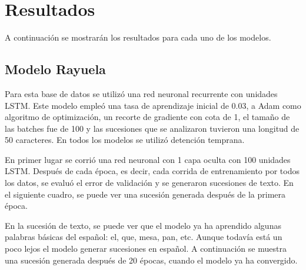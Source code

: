 \section{Resultados}
A continuación se mostrarán los resultados para cada uno de los modelos.

\subsection{Modelo Rayuela}
Para esta base de datos se utilizó una red neuronal recurrente con unidades LSTM. Este modelo empleó una tasa de aprendizaje inicial de 0.03, a Adam como algoritmo de optimización, un recorte de gradiente con cota de 1, el tamaño de las batches fue de 100 y las sucesiones que se analizaron tuvieron una longitud de 50 caracteres. En todos los modelos se utilizó detención temprana.

\vspace{1em}

En primer lugar se corrió una red neuronal con 1 capa oculta con 100 unidades LSTM. Después de cada época, es decir, cada corrida de entrenamiento por todos los datos, se evaluó el error de validación y se generaron sucesiones de texto. En el siguiente cuadro, se puede ver una sucesión generada después de la primera época.
\vspace{1em}


\vspace{1em}

En la sucesión de texto, se puede ver que el modelo ya ha aprendido algunas palabras básicas del español: el, que, mesa, pan, etc. Aunque todavía está un poco lejos el modelo generar sucesiones en español. A continuación se muestra una sucesión generada después de 20 épocas, cuando el modelo ya ha convergido.

\vspace{1em}

